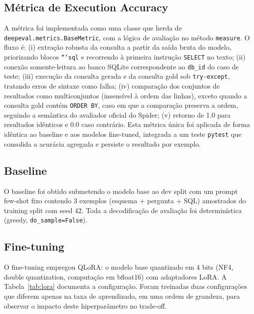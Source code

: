 \documentclass[conference]{IEEEtran}
\begin{document}
\subsection{Métrica de Execution Accuracy}
A métrica foi implementada como uma classe que herda de
\texttt{deepeval.metrics.BaseMetric}, com a lógica de avaliação no
método \texttt{measure}. O fluxo é: (i) extração robusta da consulta a
partir da saída bruta do modelo, priorizando blocos \texttt{```sql} e
recorrendo à primeira instrução \texttt{SELECT} no texto; (ii) conexão
somente-leitura ao banco SQLite correspondente ao \texttt{db\_id} do
caso de teste; (iii) execução da consulta gerada e da consulta gold sob
\texttt{try-except}, tratando erros de sintaxe como falha; (iv)
comparação dos conjuntos de resultados como multiconjuntos (insensível à
ordem das linhas), exceto quando a consulta gold contém
\texttt{ORDER BY}, caso em que a comparação preserva a ordem, seguindo a
semântica do avaliador oficial do Spider; (v) retorno de 1.0 para
resultados idênticos e 0.0 caso contrário. Esta métrica única foi
aplicada de forma idêntica ao baseline e aos modelos fine-tuned,
integrada a um teste \texttt{pytest} que consolida a acurácia agregada e
persiste o resultado por exemplo.

\subsection{Baseline}
O baseline foi obtido submetendo o modelo base ao dev split com um
prompt few-shot fixo contendo 3 exemplos (esquema + pergunta + SQL)
amostrados do training split com seed 42. Toda a decodificação de
avaliação foi determinística (greedy, \texttt{do\_sample=False}).

\subsection{Fine-tuning}
O fine-tuning empregou QLoRA: o modelo base quantizado em 4 bits (NF4,
double quantization, computação em bfloat16) com adaptadores LoRA. A
Tabela~\ref{tab:lora} documenta a configuração. Foram treinadas duas
configurações que diferem apenas na taxa de aprendizado, em uma ordem de
grandeza, para observar o impacto deste hiperparâmetro no trade-off.
\end{document}
